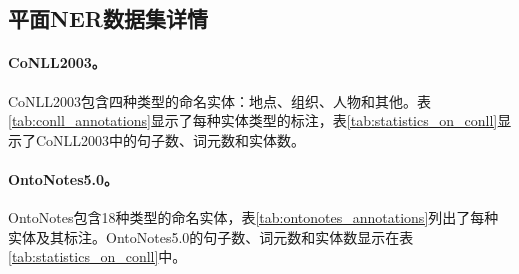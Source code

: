 \documentclass[supercite]{Experimental_Report}
\theoremstyle{definition}
\begin{document}
\begin{table}[th!]
    \centering
     \caption{数据集ACE2004和ACE2005的实体标注。}
    \label{tab:ace_annotations}
\end{table}

\subsection{平面NER数据集详情}
\label{flat_ner_datasets_details}

\paragraph{CoNLL2003。}CoNLL2003\cite{sang2003introduction}包含四种类型的命名实体：地点、组织、人物和其他。表\ref{tab:conll_annotations}显示了每种实体类型的标注，表\ref{tab:statistics_on_conll}显示了CoNLL2003中的句子数、词元数和实体数。

\paragraph{OntoNotes5.0。}OntoNotes\cite{pradhan2013towards}包含18种类型的命名实体，表\ref{tab:ontonotes_annotations}列出了每种实体及其标注。OntoNotes5.0的句子数、词元数和实体数显示在表\ref{tab:statistics_on_conll}中。
\end{document}
